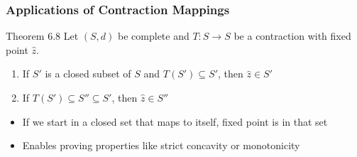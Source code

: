 \documentclass[9pt,aspectratio=169]{beamer}
\begin{document}




\begin{frame}
\frametitle{Applications of Contraction Mappings}

\begin{block}{Theorem 6.8}
Let $(S,d)$ be complete and $T: S \to S$ be a contraction with fixed point $\hat{z}$.
\begin{enumerate}
    \item If $S'$ is a closed subset of $S$ and $T(S') \subseteq S'$, then
    $\hat{z} \in S'$
    \item If $T(S') \subseteq S'' \subseteq S'$, then $\hat{z} \in S''$
\end{enumerate}
\end{block}

\begin{itemize}
    \item If we start in a closed set that maps to itself, fixed point is in
    that set
    \item Enables proving properties like strict concavity or monotonicity
\end{itemize}

\end{frame}
\end{document}
